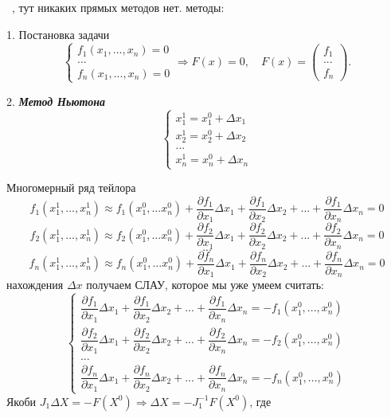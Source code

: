 \documentclass[9pt]{article}
\begin{document}
\ 
, тут никаких прямых методов нет.
 методы:
\par1. Постановка задачи
\[\left\{
\begin{array}{l}
    f_1(x_1,...,x_n)=0 \\
    ... \\
    f_n(x_1,...,x_n)=0
\end{array}\right.\Rightarrow F(x)=0,\quad F(x)=
\left(
\begin{array}{c}
    f_1 \\
    ... \\
    f_n
\end{array}\right).\]
\par2. \textit{\textbf{Метод Ньютона}}
\[\left\{
\begin{array}{l}
    x_1^1=x_1^0+\Delta x_1 \\
    x_2^1=x_2^0+\Delta x_2 \\
    ... \\
    x_n^1=x_n^0+\Delta x_n
\end{array}\right.\]
\par Многомерный ряд тейлора
\[f_1(x_1^1,...,x_n^1)\approx f_1(x_1^0,...x_n^0)+\dfrac{\partial f_1}{\partial x_1}\Delta x_1+\dfrac{\partial f_1}{\partial x_2}\Delta x_2+...+\dfrac{\partial f_1}{\partial x_n}\Delta x_n=0\]
\[f_2(x_1^1,...,x_n^1)\approx f_2(x_1^0,...x_n^0)+\dfrac{\partial f_2}{\partial x_1}\Delta x_1+\dfrac{\partial f_2}{\partial x_2}\Delta x_2+...+\dfrac{\partial f_2}{\partial x_n}\Delta x_n=0\]
\[...\]
\[f_n(x_1^1,...,x_n^1)\approx f_n(x_1^0,...x_n^0)+\dfrac{\partial f_n}{\partial x_1}\Delta x_1+\dfrac{\partial f_n}{\partial x_2}\Delta x_2+...+\dfrac{\partial f_n}{\partial x_n}\Delta x_n=0\]
\parДля нахождения \(\Delta x\) получаем СЛАУ, которое мы уже умеем считать:
\[\left\{
\begin{array}{l}
    \dfrac{\partial f_1}{\partial x_1}\Delta x_1+\dfrac{\partial f_1}{\partial x_2}\Delta x_2+...+\dfrac{\partial f_1}{\partial x_n}\Delta x_n=-f_1(x_1^0,...,x_n^0) \\
    \dfrac{\partial f_2}{\partial x_1}\Delta x_1+\dfrac{\partial f_2}{\partial x_2}\Delta x_2+...+\dfrac{\partial f_2}{\partial x_n}\Delta x_n=-f_2(x_1^0,...,x_n^0) \\
    ... \\
    \dfrac{\partial f_n}{\partial x_1}\Delta x_1+\dfrac{\partial f_n}{\partial x_2}\Delta x_2+...+\dfrac{\partial f_n}{\partial x_n}\Delta x_n=-f_n(x_1^0,...,x_n^0)
\end{array}
\right.\]
 Якоби \(J_1\Delta X=-F(X^0)\Rightarrow\Delta X=-J^{-1}_1F(X^0)\), где
\end{document}
